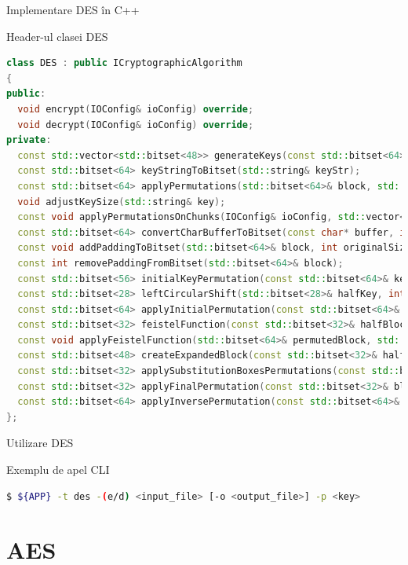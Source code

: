 \documentclass{beamer}
\begin{document}
\begin{frame}[fragile]{Implementare DES în C++}
  \begin{block}{Header-ul clasei DES}
    \begin{lstlisting}[language=C++]
class DES : public ICryptographicAlgorithm
{
public:
  void encrypt(IOConfig& ioConfig) override;
  void decrypt(IOConfig& ioConfig) override;
private:
  const std::vector<std::bitset<48>> generateKeys(const std::bitset<64>& key);
  const std::bitset<64> keyStringToBitset(std::string& keyStr);
  const std::bitset<64> applyPermutations(std::bitset<64>& block, std::vector<std::bitset<48>>& subKeys);
  void adjustKeySize(std::string& key);
  const void applyPermutationsOnChunks(IOConfig& ioConfig, std::vector<std::bitset<48>>& subKeys);
  const std::bitset<64> convertCharBufferToBitset(const char* buffer, int bufferSize);
  const void addPaddingToBitset(std::bitset<64>& block, int originalSize);
  const int removePaddingFromBitset(std::bitset<64>& block);
  const std::bitset<56> initialKeyPermutation(const std::bitset<64>& key);
  const std::bitset<28> leftCircularShift(std::bitset<28>& halfKey, int shifts);
  const std::bitset<64> applyInitialPermutation(const std::bitset<64>& block);
  const std::bitset<32> feistelFunction(const std::bitset<32>& halfBlock, const std::bitset<48>& key);
  const void applyFeistelFunction(std::bitset<64>& permutedBlock, std::vector<std::bitset<48>>& subKeys);
  const std::bitset<48> createExpandedBlock(const std::bitset<32>& halfBlock);
  const std::bitset<32> applySubstitutionBoxesPermutations(const std::bitset<48>& xored);
  const std::bitset<32> applyFinalPermutation(const std::bitset<32>& block);
  const std::bitset<64> applyInversePermutation(const std::bitset<64>& permutedBlock);
};
    \end{lstlisting}
  \end{block}
\end{frame}

\begin{frame}[fragile]{Utilizare DES}
  \begin{block}{Exemplu de apel CLI}
    \begin{lstlisting}[language=bash]
$ ${APP} -t des -(e/d) <input_file> [-o <output_file>] -p <key>
    \end{lstlisting}
  \end{block}
\end{frame}

\section{AES}
\end{document}
